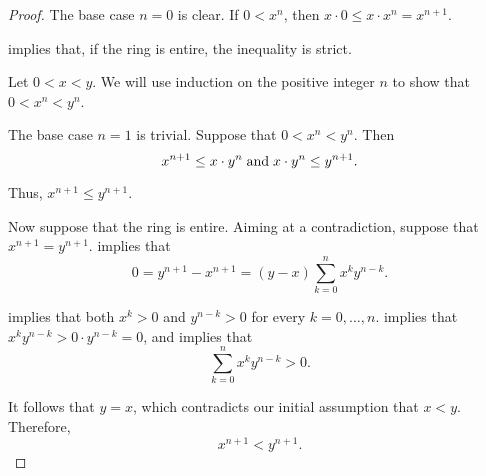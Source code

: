 \begin{proof}
  The base case \( n = 0 \) is clear. If \( 0 < x^n \), then \( x \cdot 0 \leq x \cdot x^n = x^{n+1} \).

   implies that, if the ring is entire, the inequality is strict.

   Let \( 0 < x < y \). We will use induction on the positive integer \( n \) to show that \( 0 < x^n < y^n \).

  The base case \( n = 1 \) is trivial. Suppose that \( 0 < x^n < y^n \). Then
  \begin{equation*}
    x^{n+1} \leq x \cdot y^n \T{and} x \cdot y^n \leq y^{n+1}.
  \end{equation*}

  Thus, \( x^{n+1} \leq y^{n+1} \).

  Now suppose that the ring is entire. Aiming at a contradiction, suppose that \( x^{n+1} = y^{n+1} \).  implies that
  \begin{equation*}
    0
    =
    y^{n+1} - x^{n+1}
    =
    (y - x) \sum_{k=0}^n x^k y^{n-k}.
  \end{equation*}

   implies that both \( x^k > 0 \) and \( y^{n-k} > 0 \) for every \( k = 0, \ldots, n \).  implies that \( x^k y^{n-k} > 0 \cdot y^{n-k} = 0 \), and  implies that
  \begin{equation*}
    \sum_{k=0}^n x^k y^{n-k} > 0.
  \end{equation*}

  It follows that \( y = x \), which contradicts our initial assumption that \( x < y \). Therefore,
  \begin{equation*}
    x^{n+1} < y^{n+1}.
  \end{equation*}
\end{proof}

